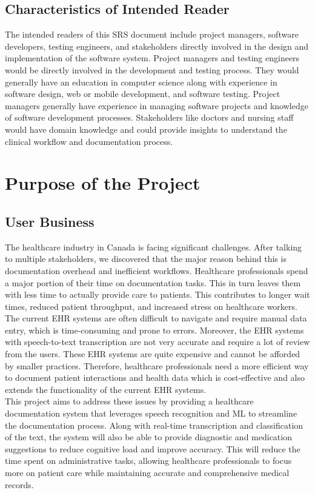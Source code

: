 \documentclass[12pt]{article}
\begin{document}
\subsection{Characteristics of Intended Reader} \label{sec_IntendedReader} 

The intended readers of this SRS document include project managers, software developers, testing engineers, and stakeholders directly involved in the design and implementation of the software system. Project managers and testing engineers would be directly involved in the development and testing process. They would generally have an education in computer science along with experience in software design, web or mobile development, and software testing. Project managers generally have experience in managing software projects and knowledge of software development processes. Stakeholders like doctors and nursing staff would have domain knowledge and could provide insights to understand the clinical workflow and documentation process. 


\section{Purpose of the Project}

\subsection{User Business}

The healthcare industry in Canada is facing significant challenges. After talking to multiple stakeholders, we discovered that the major reason behind this is documentation overhead and inefficient workflows. Healthcare professionals spend a major portion of their time on documentation tasks. This in turn leaves them with less time to actually provide care to patients. This contributes to longer wait times, reduced patient throughput, and increased stress on healthcare workers.\\
The current EHR systems are often difficult to navigate and require manual data entry, which is time-consuming and prone to errors. Moreover, the EHR systems with speech-to-text transcription are not very accurate and require a lot of review from the users. These EHR systems are quite expensive and cannot be afforded by smaller practices. Therefore, healthcare professionals need a more efficient way to document patient interactions and health data which is cost-effective and also extends the functionality of the current EHR systems.\\
This project aims to address these issues by providing a healthcare documentation system that leverages speech recognition and ML to streamline the documentation process. Along with real-time transcription and classification of the text, the system will also be able to provide diagnostic and medication suggestions to reduce cognitive load and improve accuracy. This will reduce the time spent on administrative tasks, allowing healthcare professionals to focus more on patient care while maintaining accurate and comprehensive medical records.\\
\end{document}
